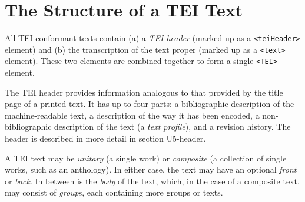 \documentclass[11pt,twoside]{article}\makeatletter
\makeatletter
\renewcommand\section{\@startsection {section}{1}{\z@}%
     {-1.75ex \@plus -0.5ex \@minus -.2ex}%
     {0.5ex \@plus .2ex}%
     {\reset@font\Large\bfseries\sffamily}}
\def\DivI{\section}
\def\DivI{\chapter}
\makeatother
\begin{document}
\DivI[The Structure of a TEI Text]{The Structure of a TEI Text}\label{U5-struc}\par
All TEI-conformant texts contain (a) a \emph{TEI header} (marked up as a \texttt{<teiHeader>} element) and (b) the transcription of the text proper (marked up as a \texttt{<text>} element). These two elements are combined together to form a single \texttt{<TEI>} element.  \par
The TEI header provides information analogous to that provided by the title page of a printed text.  It has up to four parts: a bibliographic description of the machine-readable text, a description of the way it has been encoded, a non-bibliographic description of the text (a \emph{text profile}), and a revision history. The header is described in more detail in section U5-header.\par
A TEI text may be \emph{unitary} (a single work) or \emph{composite} (a collection of single works, such as an anthology). In either case, the text may have an optional \emph{front} or \emph{back}. In between is the \emph{body} of the text, which, in the case of a composite text, may consist of \emph{group}s, each containing more groups or texts.\par
\end{document}
